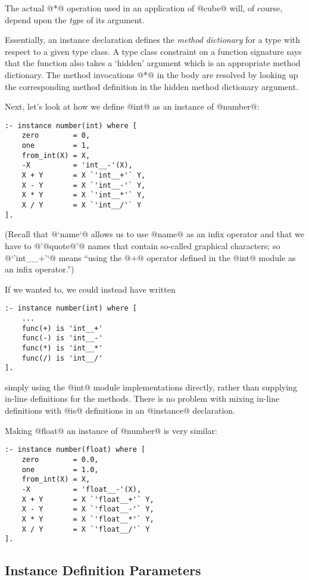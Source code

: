 The actual @*@ operation used in an application of @cube@ will, of
course, depend upon the \emph{type} of its argument.

Essentially, an instance declaration defines the \emph{method
dictionary} for a type with respect to a given type class.  A type
class constraint on a function signature says that the function also
takes a `hidden' argument which is an appropriate method dictionary.
The method invocations @*@ in the body are resolved by looking up
the corresponding method definition in the hidden method dictionary
argument.

Next, let's look at how we define @int@ as an instance of @number@:
\begin{verbatim}
:- instance number(int) where [
    zero        = 0,
    one         = 1,
    from_int(X) = X,
    -X          = 'int__-'(X),
    X + Y       = X `'int__+'` Y,
    X - Y       = X `'int__-'` Y,
    X * Y       = X `'int__*'` Y,
    X / Y       = X `'int__/'` Y
].
\end{verbatim}
(Recall that @`name`@ allows us to use @name@ as an infix operator and
that we have to @'@quote@'@ names that contain so-called graphical
characters; so @`'int__+'`@ means ``using the @+@ operator defined in
the @int@ module as an infix operator.'')

If we wanted to, we could instead have written
\begin{verbatim}
:- instance number(int) where [
    ...
    func(+) is 'int__+'
    func(-) is 'int__-'
    func(*) is 'int__*'
    func(/) is 'int__/'
].
\end{verbatim}
simply using the @int@ module implementations directly, rather than
supplying in-line definitions for the methods.  There is no problem
with mixing in-line definitions with @is@ definitions in an @instance@
declaration.

Making @float@ an instance of @number@ is very similar:
\begin{verbatim}
:- instance number(float) where [
    zero        = 0.0,
    one         = 1.0,
    from_int(X) = X,
    -X          = 'float__-'(X),
    X + Y       = X `'float__+'` Y,
    X - Y       = X `'float__-'` Y,
    X * Y       = X `'float__*'` Y,
    X / Y       = X `'float__/'` Y
].
\end{verbatim}

\subsection{Instance Definition Parameters}

